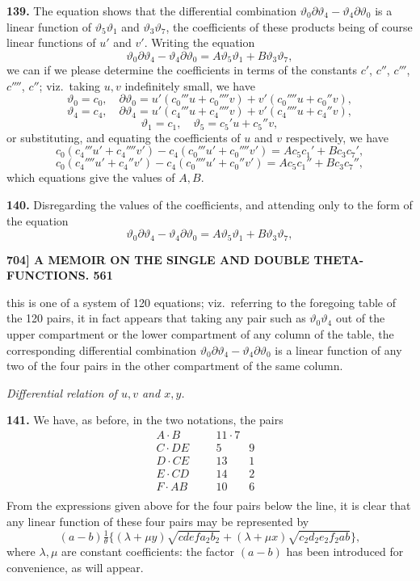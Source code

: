 \documentclass[11pt]{article}
\begin{document}
\medskip
\textbf{139.} The equation shows that the differential combination $\vartheta_0\partial\vartheta_4 - \vartheta_4\partial\vartheta_0$ is a linear function of $\vartheta_5\vartheta_1$ and $\vartheta_3\vartheta_7$, the coefficients of these products being of course linear functions of $u'$ and $v'$. Writing the equation
\[
\vartheta_0\partial\vartheta_4 - \vartheta_4\partial\vartheta_0 = A\vartheta_5\vartheta_1 + B\vartheta_3\vartheta_7,
\]
we can if we please determine the coefficients in terms of the constants $c'$, $c''$, $c'''$, $c''''$, $c''$; viz.\ taking $u, v$ indefinitely small, we have
\[
\vartheta_0 = c_0,\quad \partial\vartheta_0 = u'(c_0'''u + c_0''''v) + v'(c_0''''u + c_0''v),
\]
\[
\vartheta_4 = c_4,\quad \partial\vartheta_4 = u'(c_4'''u + c_4''''v) + v'(c_4''''u + c_4''v),
\]
\[
\vartheta_1 = c_1,\quad \vartheta_5 = c_5'u + c_5''v,
\]
or substituting, and equating the coefficients of $u$ and $v$ respectively, we have
\[
c_0(c_4'''u' + c_4''''v') - c_4(c_0'''u' + c_0''''v') = Ac_5c_1' + Bc_3c_7',
\]
\[
c_0(c_4''''u' + c_4''v') - c_4(c_0''''u' + c_0''v') = Ac_5c_1'' + Bc_3c_7'',
\]
which equations give the values of $A, B$.

\medskip
\textbf{140.} Disregarding the values of the coefficients, and attending only to the form of the equation
\[
\vartheta_0\partial\vartheta_4 - \vartheta_4\partial\vartheta_0 = A\vartheta_5\vartheta_1 + B\vartheta_3\vartheta_7,
\]

\newpage
\noindent\textbf{704] \quad A MEMOIR ON THE SINGLE AND DOUBLE THETA-FUNCTIONS. \hfill 561}

\medskip
this is one of a system of 120 equations; viz.\ referring to the foregoing table of the 120 pairs, it in fact appears that taking any pair such as $\vartheta_0\vartheta_4$ out of the upper compartment or the lower compartment of any column of the table, the corresponding differential combination $\vartheta_0\partial\vartheta_4 - \vartheta_4\partial\vartheta_0$ is a linear function of any two of the four pairs in the other compartment of the same column.

\medskip
\begin{center}\textit{Differential relation of $u, v$ and $x, y$.}\end{center}

\medskip
\textbf{141.} We have, as before, in the two notations, the pairs
\[
\begin{array}{cccccc}
A\cdot B & & & 11\cdot 7 & & \\
C\cdot DE & & & 5 & 9 & \\
D\cdot CE & & & 13 & 1 & \\
E\cdot CD & & & 14 & 2 & \\
F\cdot AB & & & 10 & 6 & \\
\end{array}
\]
From the expressions given above for the four pairs below the line, it is clear that any linear function of these four pairs may be represented by
\[
(a - b)\tfrac{1}{\theta}\bigl\{(\lambda + \mu y)\sqrt{cdefa_2b_2} + (\lambda + \mu x)\sqrt{c_2d_2e_2f_2ab}\bigr\},
\]
where $\lambda, \mu$ are constant coefficients: the factor $(a - b)$ has been introduced for convenience, as will appear.
\end{document}
